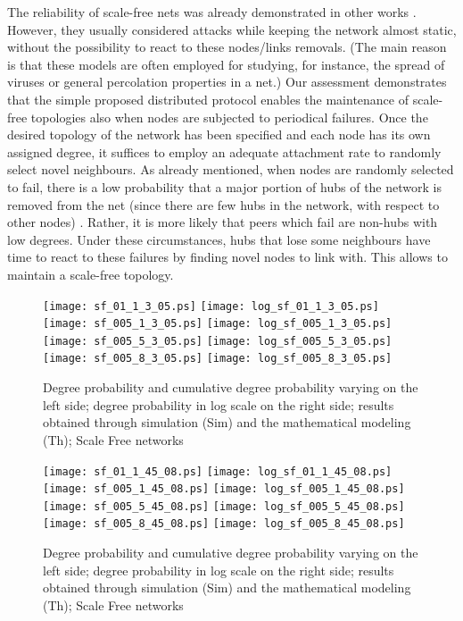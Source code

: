 \documentclass[a4paper,twosided]{article}
\begin{document}
The reliability of scale-free nets was already demonstrated in other works \cite{Verlag03structuralproperties,Newman03thestructure,2000Nature_Albert,dumitriu}. However, they usually considered attacks while keeping the network almost static, without the possibility to react to these nodes/links removals. (The main reason is that these models are often employed for studying, for instance, the spread of viruses or general percolation properties in a net.) Our assessment demonstrates that the simple proposed distributed protocol enables the maintenance of scale-free topologies also when nodes are subjected to periodical failures. Once the desired topology of the network has been specified and each node has its own assigned degree, it suffices to employ an adequate attachment rate to randomly select novel neighbours.
As already mentioned, when nodes are randomly selected to fail, there is a low probability that a major portion of hubs of the network is removed from the net (since there are few hubs in the network, with respect to other nodes) \cite{Newman03thestructure,newmanHandbook}. Rather, it is more likely that peers which fail are non-hubs with low degrees. Under these circumstances, hubs that lose some neighbours have time to react to these failures by finding novel nodes to link with. This allows to maintain a scale-free topology.

\begin{figure}
   \centering
   \texttt{[image: sf\_01\_1\_3\_05.ps]}
   \texttt{[image: log\_sf\_01\_1\_3\_05.ps]}
   \texttt{[image: sf\_005\_1\_3\_05.ps]}
   \texttt{[image: log\_sf\_005\_1\_3\_05.ps]}
   \texttt{[image: sf\_005\_5\_3\_05.ps]}
   \texttt{[image: log\_sf\_005\_5\_3\_05.ps]}
   \texttt{[image: sf\_005\_8\_3\_05.ps]}
   \texttt{[image: log\_sf\_005\_8\_3\_05.ps]}
   \caption{Degree probability and cumulative degree probability varying  on the left side; degree probability in log scale on the right side; results obtained through simulation (Sim) and the mathematical modeling (Th); Scale Free networks }
   \label{fig:fig_sf9}
\end{figure}


\begin{figure}
   \centering
   \texttt{[image: sf\_01\_1\_45\_08.ps]}
   \texttt{[image: log\_sf\_01\_1\_45\_08.ps]}
   \texttt{[image: sf\_005\_1\_45\_08.ps]}
   \texttt{[image: log\_sf\_005\_1\_45\_08.ps]}
   \texttt{[image: sf\_005\_5\_45\_08.ps]}
   \texttt{[image: log\_sf\_005\_5\_45\_08.ps]}
   \texttt{[image: sf\_005\_8\_45\_08.ps]}
   \texttt{[image: log\_sf\_005\_8\_45\_08.ps]}
   \caption{Degree probability and cumulative degree probability varying  on the left side; degree probability in log scale on the right side; results obtained through simulation (Sim) and the mathematical modeling (Th); Scale Free networks }
   \label{fig:fig_sf11}
\end{figure}
\end{document}
